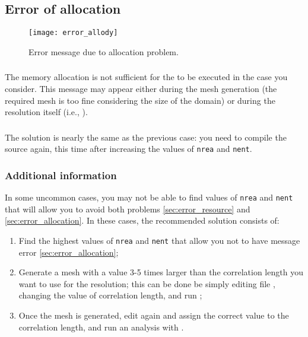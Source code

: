\subsection{Error of allocation \label{sec:error_allocation}}

\begin{figure}[htpb]
\centering
\texttt{[image: error\_allody]}
\caption{Error message due to allocation problem.\label{fig:error_allocation}}
\end{figure}

\subsubsection{\question}

The memory allocation is not sufficient for the \diva to be executed in the case you consider. This message may appear either during the mesh generation (the required mesh is too fine considering the size of the domain) or during the resolution itself (i.e., ).

\subsubsection{\answer}

The solution is nearly the same as the previous case: you need to compile the source again, this time after increasing the values of \texttt{nrea} and \texttt{nent}.

\subsubsection[Additional information]{Additional information \expert}

In some uncommon cases, you may not be able to find values of \texttt{nrea} and \texttt{nent} that will allow you to avoid both problems \ref{sec:error_resource} and \ref{sec:error_allocation}. In these cases, the recommended solution consists of:
\begin{enumerate}
\item Find the highest values of \texttt{nrea} and \texttt{nent} that allow you not to have message error \ref{sec:error_allocation};
\item Generate a mesh with a value 3-5 times larger than the correlation length you want to use for the resolution; this can be done be simply editing file , changing the value of correlation length, and run ;
\item Once the mesh is generated, edit again  and assign the correct value to the correlation length, and run an analysis with .
\end{enumerate}

